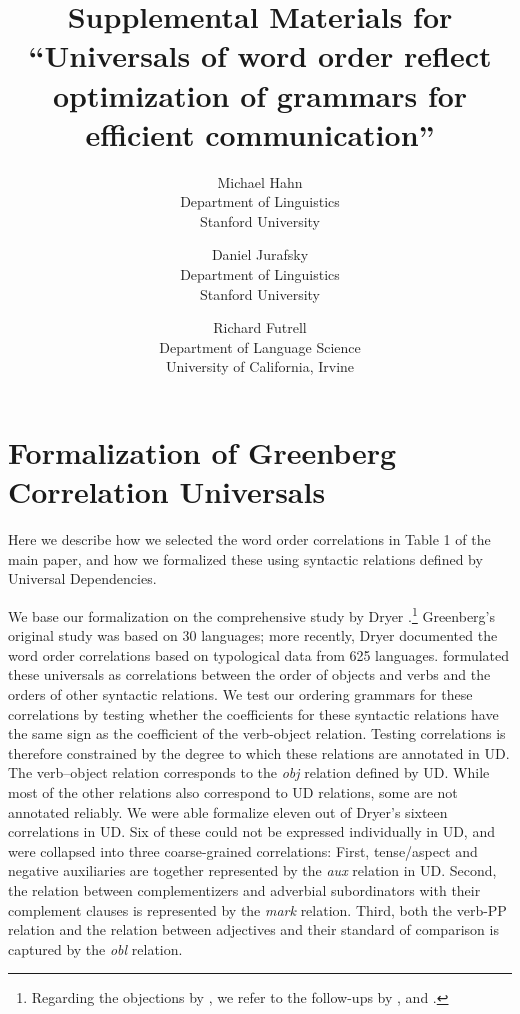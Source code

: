\documentclass[10pt,twoside,lineno]{article}
\title{Supplemental Materials for ``Universals of word order reflect optimization of grammars for efficient communication''}
\author{
        Michael Hahn \\
                Department of Linguistics\\
       Stanford University
            \and
       Daniel Jurafsky\\
       Department of Linguistics\\
       Stanford University \\
       \and
       Richard Futrell\\
       Department of Language Science\\
       University of California, Irvine
}
\begin{document}
\maketitle




\tableofcontents





\section{Formalization of Greenberg Correlation Universals}\label{sec:correlations}


Here we describe how we selected the word order correlations in Table 1 of the main paper, and how we formalized these using syntactic relations defined by Universal Dependencies.

We base our formalization on the comprehensive study by Dryer \cite{dryer1992greenbergian}.\footnote{Regarding the objections by \citet{dunn2011evolved}, we refer to the follow-ups by \citet{levy2011computational}, and \citet{croft2011greenbergian}.}
Greenberg's original study was based on 30 languages; more recently, Dryer \cite{dryer1992greenbergian} documented the word order correlations based on typological data from 625 languages.
\citet{dryer1992greenbergian} formulated these universals as correlations between the order of objects and verbs and the orders of other syntactic relations.
We test our ordering grammars for these correlations by testing whether the coefficients for these syntactic relations have the same sign as the coefficient of the verb-object relation.
Testing correlations is therefore constrained by the degree to which these relations are annotated in UD.
The verb--object relation corresponds to the  \emph{obj} relation defined by UD.
While most of the other relations also correspond to UD relations, some are not annotated reliably.
We were able formalize eleven out of Dryer's sixteen correlations in UD.
Six of these could not be expressed individually in UD, and were collapsed into three coarse-grained correlations:
First, tense/aspect and negative auxiliaries are together represented by the \emph{aux} relation in UD.
Second, the relation between complementizers and adverbial subordinators with their complement clauses is represented by the \emph{mark} relation.
Third, both the verb-PP relation and the relation between adjectives and their standard of comparison is captured by the \emph{obl} relation.
\end{document}
